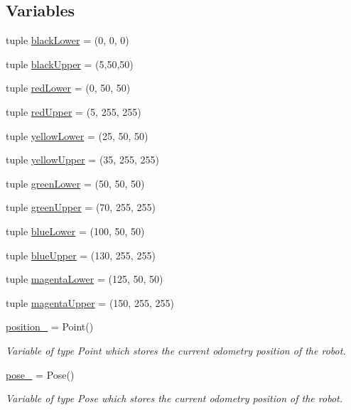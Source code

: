 \subsection*{Variables}
\begin{DoxyCompactItemize}
\item 
tuple \hyperlink{namespacetrack_a4ee13246ec46c21cfdcfee1b16f7eec4}{black\+Lower} = (0, 0, 0)
\item 
tuple \hyperlink{namespacetrack_a7c7120c727a2836315550f0091cd7277}{black\+Upper} = (5,50,50)
\item 
tuple \hyperlink{namespacetrack_a760fae991a015aa4ee4c08fcaadeb576}{red\+Lower} = (0, 50, 50)
\item 
tuple \hyperlink{namespacetrack_a1549403b0cb47b249afba9cdeca7ec16}{red\+Upper} = (5, 255, 255)
\item 
tuple \hyperlink{namespacetrack_a29d421bd8aa932d14a9cbf7779bba62b}{yellow\+Lower} = (25, 50, 50)
\item 
tuple \hyperlink{namespacetrack_a2071c6a41ecce68b84c956b0c5f8219a}{yellow\+Upper} = (35, 255, 255)
\item 
tuple \hyperlink{namespacetrack_ae3b9cb19e6647fa48bae473c1b3152ea}{green\+Lower} = (50, 50, 50)
\item 
tuple \hyperlink{namespacetrack_a2a45da69392a010f85aa42de064d7c85}{green\+Upper} = (70, 255, 255)
\item 
tuple \hyperlink{namespacetrack_a222fd73291da99272b344d9089ce0fde}{blue\+Lower} = (100, 50, 50)
\item 
tuple \hyperlink{namespacetrack_ae6e375645538a7968d81c8ebe9ee5b7d}{blue\+Upper} = (130, 255, 255)
\item 
tuple \hyperlink{namespacetrack_a4778acbcac36117d4384a64aff1283bd}{magenta\+Lower} = (125, 50, 50)
\item 
tuple \hyperlink{namespacetrack_a159d6ddb51827712e530f1f1e59369c7}{magenta\+Upper} = (150, 255, 255)
\item 
\hyperlink{namespacetrack_a7299b48bcf1df87418078ead7079339d}{position\+\_\+} = Point()
\begin{DoxyCompactList}\small\item\em Variable of type Point which stores the current odometry position of the robot. \end{DoxyCompactList}\item 
\hyperlink{namespacetrack_a4fcc239004d2df0fe5a4ea23c9b0495f}{pose\+\_\+} = Pose()
\begin{DoxyCompactList}\small\item\em Variable of type Pose which stores the current odometry position of the robot. \end{DoxyCompactList}\end{DoxyCompactItemize}


